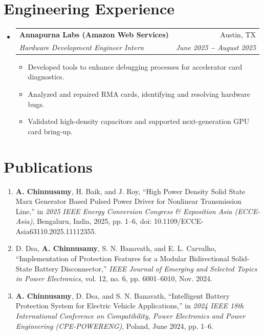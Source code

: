 \documentclass[letterpaper,11pt]{article}
\makeatletter
\newlength{\resumeTableWidth}
\newlength{\resumeListMargin}
\newlength{\resumeItemSpacing}
\newlength{\resumeSubHeadingSpacing}
\newlength{\resumeEducationSpacing}
\newcommand{\resumeItem}[1]{
  \item\small{
    {#1 \vspace{\resumeItemSpacing}}
  }
}
\newcommand{\resumeSubheading}[4]{
  \vspace{\resumeItemSpacing}\item
    \begin{tabular*}{\resumeTableWidth}[t]{l@{\extracolsep{\fill}}r}
      \textbf{#1} & #2 \\
      \textit{\small#3} & \textit{\small #4} \\
    \end{tabular*}\vspace{\resumeSubHeadingSpacing}
}
\newcommand{\resumeSubHeadingListStart}{\begin{itemize}[leftmargin=\resumeListMargin, label={}]}
\newcommand{\resumeSubHeadingListEnd}{\end{itemize}}
\newcommand{\resumeItemListStart}{\begin{itemize}}
\newcommand{\resumeItemListEnd}{\end{itemize}\vspace{\resumeEducationSpacing}}
\makeatother
\begin{document}
\vspace{3pt}

\section{Engineering Experience}
\vspace{3pt}
\resumeSubHeadingListStart
  \resumeSubheading
    {Annapurna Labs (Amazon Web Services)}{Austin, TX}
    {Hardware Development Engineer Intern}{June 2025 \textbf{--} August 2025}
    \resumeItemListStart
      \resumeItem{Developed tools to enhance debugging processes for accelerator card diagnostics.}
      \resumeItem{Analyzed and repaired RMA cards, identifying and resolving hardware bugs.}
      \resumeItem{Validated high-density capacitors and supported next-generation GPU card bring-up.}
    \resumeItemListEnd
\resumeSubHeadingListEnd
\vspace{3pt}

\section{Publications}
\begin{enumerate}
    \item \textbf{A. Chinnusamy}, H. Baik, and J. Roy, ``High Power Density Solid State Marx Generator Based Pulsed Power Driver for Nonlinear Transmission Line,'' in \textit{2025 IEEE Energy Conversion Congress \& Exposition Asia (ECCE-Asia)}, Bengaluru, India, 2025, pp. 1--6, doi: 10.1109/ECCE-Asia63110.2025.11112355. \\
    \item D. Dsa, \textbf{A. Chinnusamy}, S. N. Banavath, and E. L. Carvalho, ``Implementation of Protection Features for a Modular Bidirectional Solid-State Battery Disconnector,'' \textit{IEEE Journal of Emerging and Selected Topics in Power Electronics}, vol. 12, no. 6, pp. 6001--6010, Nov. 2024.
    \item \textbf{A. Chinnusamy}, D. Dsa, and S. N. Banavath, ``Intelligent Battery Protection System for Electric Vehicle Applications,'' in \textit{2024 IEEE 18th International Conference on Compatibility, Power Electronics and Power Engineering (CPE-POWERENG)}, Poland, June 2024, pp. 1--6.
\end{enumerate}
\end{document}
